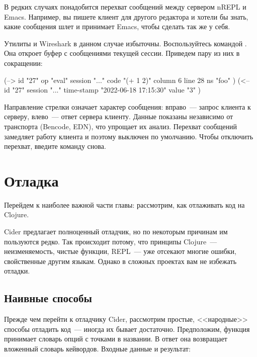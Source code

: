 В редких случаях понадобится перехват сообщений между сервером nREPL и Emacs. Например, вы пишете клиент для другого редактора и хотели бы знать, какие сообщения шлет и принимает Emacs, чтобы сделать так же у себя.

Утилиты  и Wireshark в данном случае избыточны. Воспользуйтесь командой . Она откроет буфер  с сообщениями текущей сессии. Приведем пару из них в сокращении:

\begin{english}
  \begin{text}
(-->
  id        "27"
  op        "eval"
  session   "..."
  code      "(+ 1 2)"
  column    6
  line      28
  ns        "foo"
)
(<--
  id         "27"
  session    "..."
  time-stamp "2022-06-18 17:15:30"
  value      "3"
)
  \end{text}
\end{english}

Направление стрелки означает характер сообщения: вправо~--- запрос клиента к серверу, влево~--- ответ сервера клиенту. Данные показаны независимо от транспорта (Bencode, EDN), что упрощает их анализ. Перехват сообщений замедляет работу клиента и поэтому выключен по умолчанию. Чтобы отключить перехват, введите команду снова.

\section{Отладка}

\label{section-debug}

Перейдем к наиболее важной части главы: рассмотрим, как отлаживать код на Clojure.

Cider предлагает полноценный отладчик, но по некоторым причинам им пользуются редко. Так происходит потому, что принципы Clojure~--- неизменяемость, чистые функции, REPL~--- уже отсекают многие ошибки, свойственные другим языкам. Однако в сложных проектах вам не избежать отладки.

\subsection{Наивные способы}

Прежде чем перейти к отладчику Cider, рассмотрим простые, <<народные>> способы отладить код~--- иногда их бывает достаточно. Предположим, функция принимает словарь опций с точками в названии. В ответ она возвращает вложенный словарь кейвордов. Входные данные и результат:

